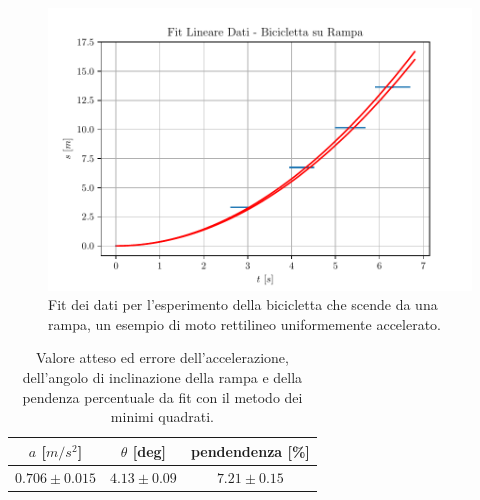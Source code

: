 \documentclass{report} \usepackage[T1]{fontenc} \usepackage[italian]{babel}
\begin{document}
\begin{figure}[H]
  \centering
  \includegraphics[width=\textwidth]{fit_bike}
  \caption{Fit dei dati per l'esperimento della bicicletta che scende da una rampa,
           un esempio di moto rettilineo uniformemente accelerato.}
  \label{fig:fit_bike}
\end{figure}

\begin{table}[H]
  \renewcommand{\arraystretch}{1.5}
  \centering
  \begin{tabular}{ | c | c | c | }
    \hline
    $a$ [$m/s^2$] &  $\theta$ [deg] & pendendenza [\%] \\
    \hline
    $0.706\pm0.015$ & $4.13\pm0.09$ & $7.21\pm0.15$ \\
    \hline
  \end{tabular}
  \caption{Valore atteso ed errore dell'accelerazione, dell'angolo di inclinazione della rampa
           e della pendenza percentuale da fit con il metodo dei minimi quadrati.}
  \label{tab:fit_bike}
\end{table}

\nocite{trowbridge1980investigation}
\nocite{bernardini2012thinking}

{}

\end{document}

